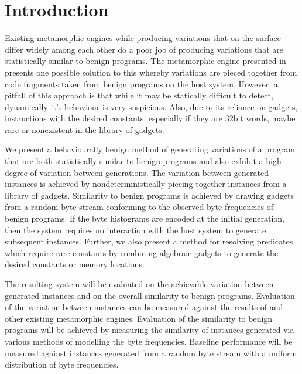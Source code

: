 \chapter{Introduction}

    Existing metamorphic engines while producing variations that on the surface
    differ widely among each other do a poor job of producing variations that
    are statistically similar to benign programs. The metamorphic engine
    presented in \cite{franken} presents one possible solution to this whereby
    variations are pieced together from code fragments taken from benign
    programs on the host system. However, a pitfall of this approach is that
    while it may be statically difficult to detect, dynamically it's behaviour
    is very suspicious. Also, due to its reliance on gadgets, instructions with
    the desired constants, especially if they are 32bit words, maybe rare or
    nonexistent in the library of gadgets.

    We present a behaviourally benign method of generating variations of a
    program that are both statistically similar to benign programs and also
    exhibit a high degree of variation between generations. The variation
    between generated instances is achieved by nondeterministically piecing
    together instances from a library of gadgets. Similarity to benign programs
    is achieved by drawing gadgets from a random byte stream conforming to the
    observed byte frequencies of benign programs. If the byte histograms are
    encoded at the initial generation, then the system requires no interaction
    with the host system to generate subsequent instances. Further, we also
    present a method for resolving predicates which require rare constants by
    combining algebraic gadgets to generate the desired constants or memory
    locations. 

    The resulting system will be evaluated on the achievable variation between
    generated instances and on the overall similarity to benign programs.
    Evaluation of the variation between instances can be measured against the
    results of \cite{franken} and other existing metamorphic engines. Evaluation
    of the similarity to benign programs will be achieved by measuring the
    similarity of instances generated via various methods of modelling the byte
    frequencies. Baseline performance will be measured against instances
    generated from a random byte stream with a uniform distribution of byte
    frequencies.

